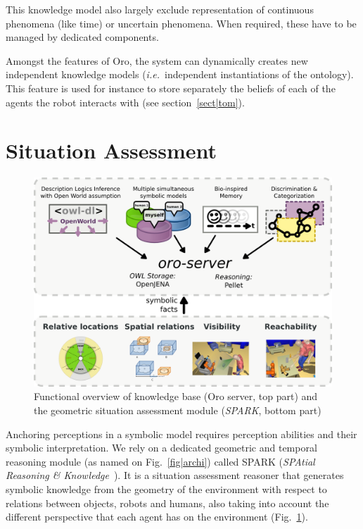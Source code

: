 \documentclass[letterpaper, 10 pt, conference]{ieeeconf}  %
\newcommand{\ie}{{\textit{i.e.\ }}}
\begin{document}
This knowledge model also largely exclude representation of continuous
phenomena (like time) or uncertain phenomena. When required, these have to be
managed by dedicated components.

Amongst the features of {\sc Oro}, the system can dynamically creates
new independent knowledge models (\ie independent instantiations of the
ontology). This feature is used for instance to store separately the beliefs of
each of the agents the robot interacts with (see section~\ref{sect|tom}).


\section{Situation Assessment}
\label{sect|sit-ass}

\begin{figure}
        \centering
        \includegraphics[width=\columnwidth]{spark-oro}
    \caption{Functional overview of knowledge base ({\sc Oro} server, top part) and the geometric situation assessment module (\emph{SPARK}, bottom part)}
        \label{fig|spark-oro}
\end{figure}

Anchoring perceptions in a symbolic model requires perception abilities and
their symbolic interpretation. We rely on a dedicated geometric and temporal
reasoning module (as named on Fig.~\ref{fig|archi}) called SPARK (\emph{SPAtial
Reasoning \& Knowledge}~\cite{Sisbot2011}). It is a situation assessment
reasoner that generates symbolic knowledge from the geometry of the
environment with respect to relations between objects, robots and humans,
also taking into account the different perspective that each agent has on
the environment (Fig.~\ref{fig|spark-oro}).
\end{document}
